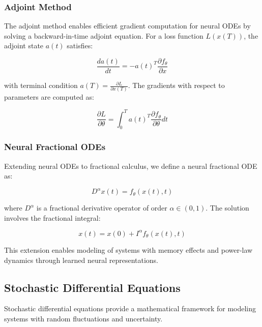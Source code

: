 \subsubsection{Adjoint Method}

The adjoint method enables efficient gradient computation for neural ODEs by solving a backward-in-time adjoint equation. For a loss function $L(x(T))$, the adjoint state $a(t)$ satisfies:

\begin{equation}
\frac{da(t)}{dt} = -a(t)^T \frac{\partial f_\theta}{\partial x}
\end{equation}

with terminal condition $a(T) = \frac{\partial L}{\partial x(T)}$. The gradients with respect to parameters are computed as:

\begin{equation}
\frac{\partial L}{\partial \theta} = \int_0^T a(t)^T \frac{\partial f_\theta}{\partial \theta} dt
\end{equation}

\subsubsection{Neural Fractional ODEs}

Extending neural ODEs to fractional calculus, we define a neural fractional ODE as:

\begin{equation}
D^{\alpha} x(t) = f_\theta(x(t), t)
\end{equation}

where $D^{\alpha}$ is a fractional derivative operator of order $\alpha \in (0,1)$. The solution involves the fractional integral:

\begin{equation}
x(t) = x(0) + I^{\alpha} f_\theta(x(t), t)
\end{equation}

This extension enables modeling of systems with memory effects and power-law dynamics through learned neural representations.

\subsection{Stochastic Differential Equations}

Stochastic differential equations provide a mathematical framework for modeling systems with random fluctuations and uncertainty.

